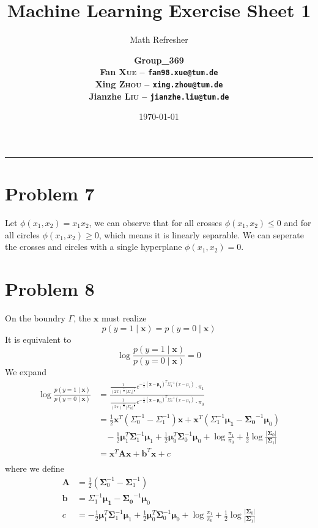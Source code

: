 \documentclass[12pt]{scrartcl}
\title{\large Machine Learning Exercise Sheet 1}
\subtitle{\Large Math Refresher}
\author{\large\bfseries Group\_369 \\
        \large Fan \textsc{Xue} -- \texttt{fan98.xue@tum.de} \\
        \large Xing \textsc{Zhou} -- \texttt{xing.zhou@tum.de} \\
        \large Jianzhe \textsc{Liu} -- \texttt{jianzhe.liu@tum.de}}
\date{\large \today}
\newcommand{\vect}[1]{\boldsymbol{#1}}
\newcommand{\ve}{\vect}
\begin{document}
  \maketitle
  \vspace{-1cm}
  \noindent\rule{\textwidth}{0.4pt}
  \section*{Problem 7}
  Let $\phi\left( x_1,x_2 \right) = x_1x_2 $, we can observe that for all crosses $\phi\left( x_1, x_2 \right) \le 0$ 
  and for all circles $\phi\left( x_1, x_2 \right)  \ge  0$, which means it is linearly separable.
  We can seperate the crosses and circles with a single hyperplane $\phi\left( x_1, x_2 \right) = 0$.

  \section*{Problem 8}
  On the boundry $\Gamma$, the $\ve{x}$ must realize \[
  p\left( y = 1 \mid \ve{x} \right) = p \left( y = 0 \mid \ve{x} \right) 
  \]
  It is equivalent to \[
  \log \frac{p\left( y = 1 \mid \ve{x} \right) }{p\left( y = 0 \mid  \ve{x} \right) } = 0
  \] 
  We expand \[
  \begin{split}
      \log \frac{p\left( y = 1 \mid \ve{x} \right) }{p\left( y = 0 \mid  \ve{x} \right) } &= 
      \frac{\frac{1}{\left( 2\pi \right) ^{\frac{D}{2}} \left| \Sigma_1 \right|^{\frac{1}{2}}}e^{-\frac{1}{2}\left( \ve{x} - \ve{\mu_1} \right) ^{T}\Sigma_1^{-1}\left( x - \mu_1 \right) } \cdot \pi_1 }{\frac{1}{\left( 2\pi \right) ^{\frac{D}{2}} \left| \Sigma_0 \right|^{\frac{1}{2}}}e^{-\frac{1}{2}\left( \ve{x} - \ve{\mu_0} \right) ^{T}\Sigma_0^{-1}\left( x - \mu_0 \right) } \cdot \pi_0 }\\
      &= \frac{1}{2}\ve{x}^{T}\left( \Sigma_0^{-1} - \Sigma_1^{-1} \right)\ve{x}
      + \ve{x}^{T}\left( \Sigma_1^{-1}\ve{\mu_1} - \ve{\Sigma_0}^{-1}\ve{\mu}_0 \right) \\
      &\ \ \ \ - \frac{1}{2} \ve{\mu}_1^{T}\ve{\Sigma}_1^{-1}\ve{\mu}_1 + \frac{1}{2} \ve{\mu}_0^{T}\ve{\Sigma}_0^{-1}\ve{\mu}_0 
      + \log \frac{\pi_1}{\pi_0} + \frac{1}{2} \log \frac{\left| \ve{\Sigma}_0 \right| }{\left|\ve{\Sigma}_1\right|} \\
      &= \ve{x}^T \ve{A}\ve{x} + \ve{b}^T\ve{x} + c \\
  \end{split}
  \]  
  where we define \[
  \begin{split}
      \ve{A} &= \frac{1}{2}\left( \ve{\Sigma}_0^{-1} -\ve{ \Sigma}_1^{-1} \right) \\
      \ve{b} &=  \Sigma_1^{-1}\ve{\mu_1} - \ve{\Sigma_0}^{-1}\ve{\mu}_0\\
      c &=  - \frac{1}{2} \ve{\mu}_1^{T}\ve{\Sigma}_1^{-1}\ve{\mu}_1 + \frac{1}{2} \ve{\mu}_0^{T}\ve{\Sigma}_0^{-1}\ve{\mu}_0 
          + \log \frac{\pi_1}{\pi_0} + \frac{1}{2} \log \frac{\left| \ve{\Sigma}_0 \right| }{\left|\ve{\Sigma}_1\right|} \\
  \end{split}
  \] 


  

 
\end{document}
